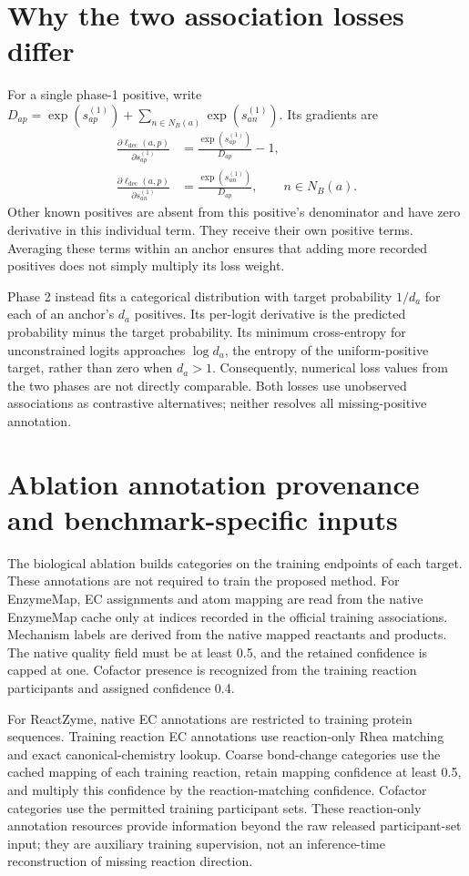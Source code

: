 \section{Why the two association losses differ}
\label{app:v4-loss-behavior}
For a single phase-1 positive, write
$D_{ap}=\exp(s_{ap}^{(1)})+\sum_{n\in N_B(a)}\exp(s_{an}^{(1)})$. Its gradients are
\begin{align}
  \frac{\partial\ell_{\mathrm{dec}}(a,p)}{\partial s_{ap}^{(1)}}
      &=\frac{\exp(s_{ap}^{(1)})}{D_{ap}}-1,\\
  \frac{\partial\ell_{\mathrm{dec}}(a,p)}{\partial s_{an}^{(1)}}
      &=\frac{\exp(s_{an}^{(1)})}{D_{ap}},\qquad n\in N_B(a).
\end{align}
Other known positives are absent from this positive's denominator and have
zero derivative in this individual term. They receive their own positive
terms. Averaging these terms within an anchor ensures that adding more
recorded positives does not simply multiply its loss weight.

Phase 2 instead fits a categorical distribution with target probability
$1/d_a$ for each of an anchor's $d_a$ positives. Its per-logit derivative is
the predicted probability minus the target probability. Its minimum
cross-entropy for unconstrained logits approaches $\log d_a$, the entropy
of the uniform-positive target, rather than zero when $d_a>1$.
Consequently, numerical loss values from the two phases are not directly
comparable. Both losses use unobserved associations as contrastive
alternatives; neither resolves all missing-positive annotation.

\section{Ablation annotation provenance and benchmark-specific inputs}
\label{app:v4-annotations}
The biological ablation builds categories on the training endpoints of each
target. These annotations are not required to train the proposed method.
For EnzymeMap, EC assignments and atom mapping are read from the native
EnzymeMap cache only at indices recorded in the official training
associations. Mechanism labels are derived from the native mapped reactants
and products. The native quality field must be at least 0.5, and the retained
confidence is capped at one. Cofactor presence is recognized from the
training reaction participants and assigned confidence 0.4.

For ReactZyme, native EC annotations are restricted to training protein
sequences. Training reaction EC annotations use reaction-only Rhea matching
and exact canonical-chemistry lookup. Coarse bond-change categories use
the cached mapping of each training reaction, retain mapping confidence at
least 0.5, and multiply this confidence by the reaction-matching confidence.
Cofactor categories use the permitted training participant sets. These
reaction-only annotation resources provide information beyond the raw
released participant-set input; they are auxiliary training supervision,
not an inference-time reconstruction of missing reaction direction.


